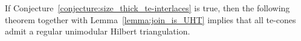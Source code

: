 \documentclass[11pt,a4paper]{amsart}
\theoremstyle{plain}
\theoremstyle{definition}
\newcommand{\cal}[1]{\mathcal{#1}}
\DeclareMathOperator{\cone}{cone}
\renewcommand{\cal}[1]{\mathcal{#1}}
\begin{document}

If Conjecture~\ref{conjecture:size_thick_te-interlaces} is true, then the following theorem together with Lemma~\ref{lemma:join_is_UHT} implies that all te-cones admit a regular unimodular Hilbert triangulation.
\end{document}
